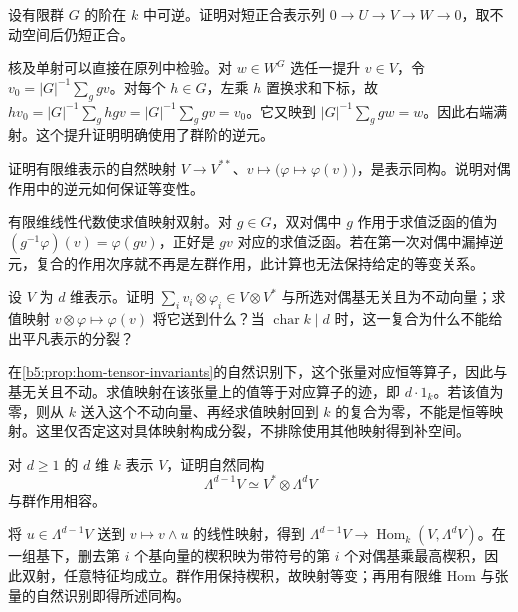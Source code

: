\begin{exercise}\label{b5:ex:01-invariants-exact}
	设有限群 \(G\) 的阶在 \(k\) 中可逆。证明对短正合表示列 \(0\to U\to V\to W\to0\)，取不动空间后仍短正合。
\end{exercise}
\begin{solution}
	核及单射可以直接在原列中检验。对 \(w\in W^G\) 选任一提升 \(v\in V\)，令 \(v_0=|G|^{-1}\sum_g gv\)。对每个 \(h\in G\)，左乘 \(h\) 置换求和下标，故 \(hv_0=|G|^{-1}\sum_g hgv=|G|^{-1}\sum_g gv=v_0\)。它又映到 \(|G|^{-1}\sum_g gw=w\)。因此右端满射。这个提升证明明确使用了群阶的逆元。
\end{solution}

\begin{exercise}\label{b5:ex:01-double-dual}
	证明有限维表示的自然映射 \(V\to V^{**}\)、\(v\mapsto\bigl(\varphi\mapsto\varphi(v)\bigr)\)，是表示同构。说明对偶作用中的逆元如何保证等变性。
\end{exercise}
\begin{solution}
	有限维线性代数使求值映射双射。对 \(g\in G\)，双对偶中 \(g\) 作用于求值泛函的值为 \((g^{-1}\varphi)(v)=\varphi(gv)\)，正好是 \(gv\) 对应的求值泛函。若在第一次对偶中漏掉逆元，复合的作用次序就不再是左群作用，此计算也无法保持给定的等变关系。
\end{solution}

\begin{exercise}\label{b5:ex:01-coevaluation}
	设 \(V\) 为 \(d\) 维表示。证明 \(\sum_i v_i\otimes\varphi_i\in V\otimes V^*\) 与所选对偶基无关且为不动向量；求值映射 \(v\otimes\varphi\mapsto\varphi(v)\) 将它送到什么？当 \(\operatorname{char}k\mid d\) 时，这一复合为什么不能给出平凡表示的分裂？
\end{exercise}
\begin{solution}
	在\cref{b5:prop:hom-tensor-invariants}的自然识别下，这个张量对应恒等算子，因此与基无关且不动。求值映射在该张量上的值等于对应算子的迹，即 \(d\cdot1_k\)。若该值为零，则从 \(k\) 送入这个不动向量、再经求值映射回到 \(k\) 的复合为零，不能是恒等映射。这里仅否定这对具体映射构成分裂，不排除使用其他映射得到补空间。
\end{solution}

\begin{exercise}\label{b5:ex:01-exterior-dual}
	对 \(d\ge1\) 的 \(d\) 维 \(k\) 表示 \(V\)，证明自然同构
	\[
		\Lambda^{d-1}V\simeq V^*\otimes\Lambda^dV
	\]
	与群作用相容。
\end{exercise}
\begin{solution}
	将 \(u\in\Lambda^{d-1}V\) 送到 \(v\mapsto v\wedge u\) 的线性映射，得到 \(\Lambda^{d-1}V\to\operatorname{Hom}_k(V,\Lambda^dV)\)。在一组基下，删去第 \(i\) 个基向量的楔积映为带符号的第 \(i\) 个对偶基乘最高楔积，因此双射，任意特征均成立。群作用保持楔积，故映射等变；再用有限维 Hom 与张量的自然识别即得所述同构。
\end{solution}

